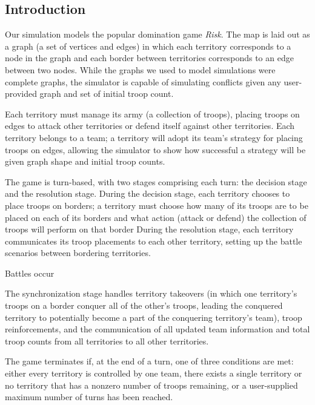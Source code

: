 \documentclass[10pt]{article}
\begin{document}
	\begin{multicols}{2}
		\section*{Introduction}
		
		Our simulation models the popular domination game \emph{Risk}. 
		The map is laid out as a graph (a set of vertices and edges) in which each territory corresponds to a node in the graph and each border between territories corresponds to an edge between two nodes. 
		While the graphs we used to model simulations were complete graphs, the simulator is capable of simulating conflicts given any user-provided graph and set of initial troop count.  

		Each territory must manage its army (a collection of troops), placing troops on edges to attack other territories or defend itself against other territories. 
		Each territory belongs to a team; a territory will adopt its team's strategy for placing troops on edges, allowing the simulator to show how successful a strategy will be given graph shape and initial troop counts.

		The game is turn-based, with two stages comprising each turn: the decision stage and the resolution stage. 
		During the decision stage, each territory chooses to place troops on borders; a territory must choose how many of its troops are to be placed on each of its borders and what action (attack or defend) the collection of troops will perform on that border 
		During the resolution stage, each territory communicates its troop placements to each other territory, setting up the battle scenarios between bordering territories.  

		Battles occur 

		
		The synchronization stage handles territory takeovers (in which one territory's troops on a border conquer all of the other's troops, leading the conquered territory to potentially become a part of the conquering territory's team), troop reinforcements, and the communication of all updated team information and total troop counts from all territories to all other territories.

		The game terminates if, at the end of a turn, one of three conditions are met: either every territory is controlled by one team, there exists a single territory or no territory that has a nonzero number of troops remaining, or a user-supplied maximum number of turns has been reached.



\end{multicols}
\end{document}
